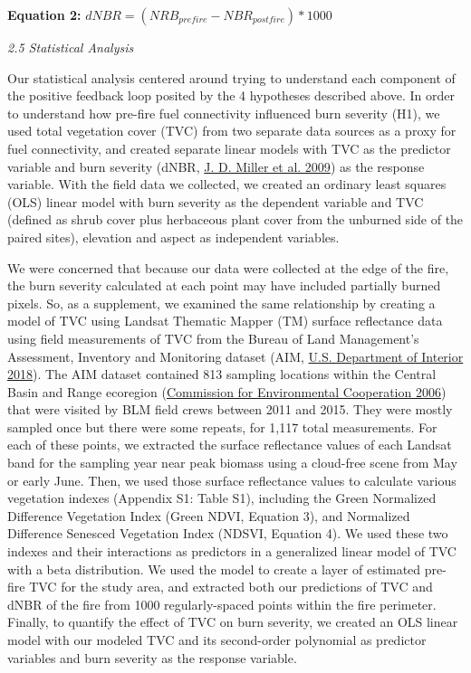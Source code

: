 \documentclass[
  12pt,
]{article}
\begin{document}
\textbf{Equation 2:} \(dNBR = (NRB_{prefire} - NBR_{postfire})*1000\)

\emph{2.5 Statistical Analysis}

Our statistical analysis centered around trying to understand each
component of the positive feedback loop posited by the 4 hypotheses
described above. In order to understand how pre-fire fuel connectivity
influenced burn severity (H1), we used total vegetation cover (TVC) from
two separate data sources as a proxy for fuel connectivity, and created
separate linear models with TVC as the predictor variable and burn
severity (dNBR, \protect\hyperlink{ref-Miller2009}{J. D. Miller et al.
2009}) as the response variable. With the field data we collected, we
created an ordinary least squares (OLS) linear model with burn severity
as the dependent variable and TVC (defined as shrub cover plus
herbaceous plant cover from the unburned side of the paired sites),
elevation and aspect as independent variables.

We were concerned that because our data were collected at the edge of
the fire, the burn severity calculated at each point may have included
partially burned pixels. So, as a supplement, we examined the same
relationship by creating a model of TVC using Landsat Thematic Mapper
(TM) surface reflectance data using field measurements of TVC from the
Bureau of Land Management's Assessment, Inventory and Monitoring dataset
(AIM, \protect\hyperlink{ref-AIM}{U.S. Department of Interior 2018}).
The AIM dataset contained 813 sampling locations within the Central
Basin and Range ecoregion (\protect\hyperlink{ref-CEC2006}{Commission
for Environmental Cooperation 2006}) that were visited by BLM field
crews between 2011 and 2015. They were mostly sampled once but there
were some repeats, for 1,117 total measurements. For each of these
points, we extracted the surface reflectance values of each Landsat band
for the sampling year near peak biomass using a cloud-free scene from
May or early June. Then, we used those surface reflectance values to
calculate various vegetation indexes (Appendix S1: Table S1), including
the Green Normalized Difference Vegetation Index (Green NDVI, Equation
3), and Normalized Difference Senesced Vegetation Index (NDSVI, Equation
4). We used these two indexes and their interactions as predictors in a
generalized linear model of TVC with a beta distribution. We used the
model to create a layer of estimated pre-fire TVC for the study area,
and extracted both our predictions of TVC and dNBR of the fire from 1000
regularly-spaced points within the fire perimeter. Finally, to quantify
the effect of TVC on burn severity, we created an OLS linear model with
our modeled TVC and its second-order polynomial as predictor variables
and burn severity as the response variable.
\end{document}
